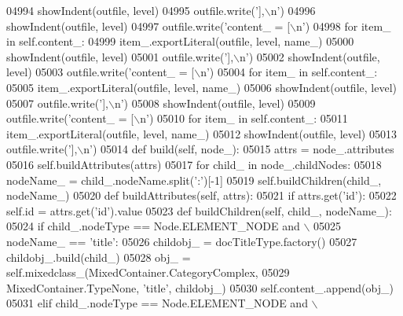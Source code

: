 \begin{DoxyCode}
{{{{{{{{{{{{{{{{{{{{{{{{{{{{{{{{{{{{{{{{{{{{{{{{{{{{{{{{{{{{{{{{{{{{{{{{{{{{{{{{{{{{{{{{{{{{{{{{{{{{{{{{{{{{{{{{{{{{{{{{{{{{{{{{{{{{{{{{{{{{{{{{{{{{{{{{{{{{{{{{{{{{{{{{{{{{{{{{{{{{{{{{{{{{{{{{{{{{{{{{{{{{{{{{{{{{{{{{{{{{{{{{{{{{{{{{{{{{{{{{{{{{{{{{{{{{{{{{{{{{{{{{{{{{{{{{{{{{{{{{{{{{{{{{{{{{{{{{{{{{{{{{{{{{{{{{{{{{{{{{{{{{{{{{{{{{04994         showIndent(outfile, level)
04995         outfile.write(\textcolor{stringliteral}{'],\(\backslash\)n'})
04996         showIndent(outfile, level)
04997         outfile.write(\textcolor{stringliteral}{'content\_ = [\(\backslash\)n'})
04998         \textcolor{keywordflow}{for} item\_ \textcolor{keywordflow}{in} self.content_:
04999             item\_.exportLiteral(outfile, level, name\_)
05000         showIndent(outfile, level)
05001         outfile.write(\textcolor{stringliteral}{'],\(\backslash\)n'})
05002         showIndent(outfile, level)
05003         outfile.write(\textcolor{stringliteral}{'content\_ = [\(\backslash\)n'})
05004         \textcolor{keywordflow}{for} item\_ \textcolor{keywordflow}{in} self.content_:
05005             item\_.exportLiteral(outfile, level, name\_)
05006         showIndent(outfile, level)
05007         outfile.write(\textcolor{stringliteral}{'],\(\backslash\)n'})
05008         showIndent(outfile, level)
05009         outfile.write(\textcolor{stringliteral}{'content\_ = [\(\backslash\)n'})
05010         \textcolor{keywordflow}{for} item\_ \textcolor{keywordflow}{in} self.content_:
05011             item\_.exportLiteral(outfile, level, name\_)
05012         showIndent(outfile, level)
05013         outfile.write(\textcolor{stringliteral}{'],\(\backslash\)n'})
05014     \textcolor{keyword}{def }build(self, node\_):
05015         attrs = node\_.attributes
05016         self.buildAttributes(attrs)
05017         \textcolor{keywordflow}{for} child\_ \textcolor{keywordflow}{in} node\_.childNodes:
05018             nodeName\_ = child\_.nodeName.split(\textcolor{stringliteral}{':'})[-1]
05019             self.buildChildren(child\_, nodeName\_)
05020     \textcolor{keyword}{def }buildAttributes(self, attrs):
05021         \textcolor{keywordflow}{if} attrs.get(\textcolor{stringliteral}{'id'}):
05022             self.id = attrs.get(\textcolor{stringliteral}{'id'}).value
05023     \textcolor{keyword}{def }buildChildren(self, child\_, nodeName\_):
05024         \textcolor{keywordflow}{if} child\_.nodeType == Node.ELEMENT\_NODE \textcolor{keywordflow}{and} \(\backslash\)
05025             nodeName\_ == \textcolor{stringliteral}{'title'}:
05026             childobj\_ = docTitleType.factory()
05027             childobj\_.build(child\_)
05028             obj\_ = self.mixedclass_(MixedContainer.CategoryComplex,
05029                 MixedContainer.TypeNone, \textcolor{stringliteral}{'title'}, childobj\_)
05030             self.content\_.append(obj\_)
05031         \textcolor{keywordflow}{elif} child\_.nodeType == Node.ELEMENT\_NODE \textcolor{keywordflow}{and} \(\backslash\)
}}}}}}}}}}}}}}}}}}}}}}}}}}}}}}}}}}}}}}}}}}}}}}}}}}}}}}}}}}}}}}}}}}}}}}}}}}}}}}}}}}}}}}}}}}}}}}}}}}}}}}}}}}}}}}}}}}}}}}}}}}}}}}}}}}}}}}}}}}}}}}}}}}}}}}}}}}}}}}}}}}}}}}}}}}}}}}}}}}}}}}}}}}}}}}}}}}}}}}}}}}}}}}}}}}}}}}}}}}}}}}}}}}}}}}}}}}}}}}}}}}}}}}}}}}}}}}}}}}}}}}}}}}}}}}}}}}}}}}}}}}}}}}}}}}}}}}}}}}}}}}}}}}}}}}}}}}}}}}}}}}}}}}}}}}}}
\end{DoxyCode}
